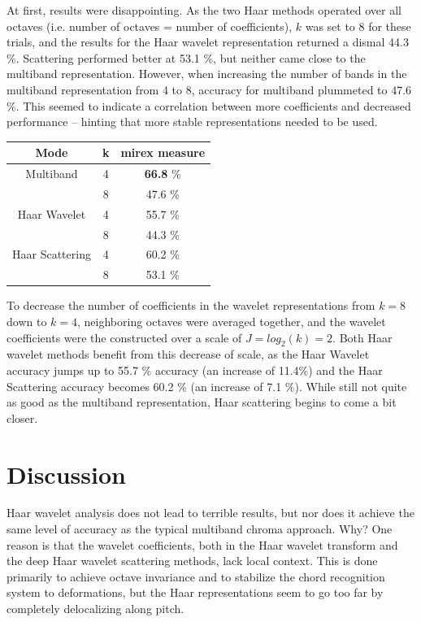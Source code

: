 \documentclass{article}
\begin{document}
	At first, results were disappointing. As the two Haar methods operated over all octaves (i.e. number of octaves = number of coefficients), $k$ was set to 8 for these trials, and the results for the Haar wavelet representation returned a dismal 44.3 \%. Scattering performed better at 53.1 \%, but neither came close to the multiband representation.  However, when increasing the number of bands in the multiband representation from 4 to 8, accuracy for multiband plummeted to 47.6 \%. This seemed to indicate a correlation between more coefficients and decreased performance -- hinting that more stable representations needed to be used.
	
	\begin{center}
	\begin{tabular} {| c | c | c |}
	\hline
	Mode & k & \textsf{mirex} measure \\
	\hline
	Multiband & 4 & \textbf{66.8} \% \\
	& 8 & 47.6 \% \\
	
	Haar Wavelet & 4 & 55.7 \% \\
	 & 8 & 44.3 \% \\
	 
	 Haar Scattering & 4 & 60.2 \% \\
	  & 8 & 53.1 \% \\
	\hline
	\end{tabular}
	\end{center}
	
	To decrease the number of coefficients in the wavelet representations from $k=8$ down to $k=4$, neighboring octaves were averaged together, and the wavelet coefficients were the constructed over a scale of $J = log_2(k) = 2$. Both Haar wavelet methods benefit from this decrease of scale, as the Haar Wavelet accuracy jumps up to 55.7 \% accuracy (an increase of 11.4\%) and the Haar Scattering accuracy becomes 60.2 \% (an increase of 7.1 \%). While still not quite as good as the multiband representation, Haar scattering begins to come a bit closer.
	

\section{Discussion}\label{sec:discussion}

Haar wavelet analysis does not lead to terrible results, but nor does it achieve the same level of accuracy as the typical multiband chroma approach. Why? One reason is that the wavelet coefficients, both in the Haar wavelet transform and the deep Haar wavelet scattering methods, lack local context. This is done primarily to achieve octave invariance and to stabilize the chord recognition system to deformations, but the Haar representations seem to go too far by completely delocalizing along pitch. 
	
\end{document}
